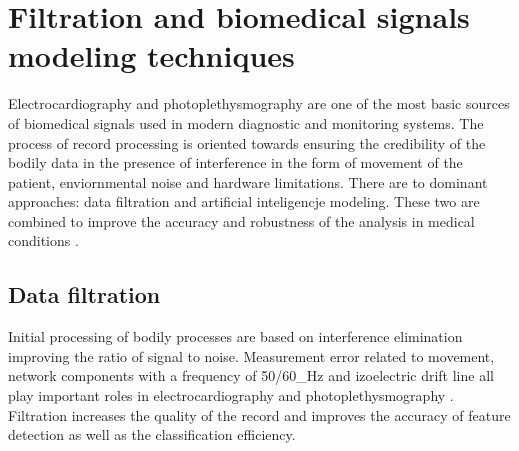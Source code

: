 \documentclass[journal]{IEEEtran}
\begin{document}
{\newpage
\section{Filtration and biomedical signals modeling techniques}
Electrocardiography and photoplethysmography are one of the most basic sources of biomedical signals used in modern diagnostic and monitoring systems. The process of record processing is oriented towards ensuring the credibility of the bodily data in the presence of interference in the form of movement of the patient, enviornmental noise and hardware limitations. There are to dominant approaches: data filtration and artificial inteligencje modeling. These two are combined to improve the accuracy and robustness of the analysis in medical conditions \cite{1}.

\subsection{Data filtration}
Initial processing of bodily processes are based on interference elimination improving the ratio of signal to noise. Measurement error related to movement, network components with a frequency of 50/60_Hz and izoelectric drift line all play important roles in electrocardiography and photoplethysmography \cite{2}. Filtration increases the quality of the record and improves the accuracy of feature detection as well as the classification efficiency.

}
\end{document}
